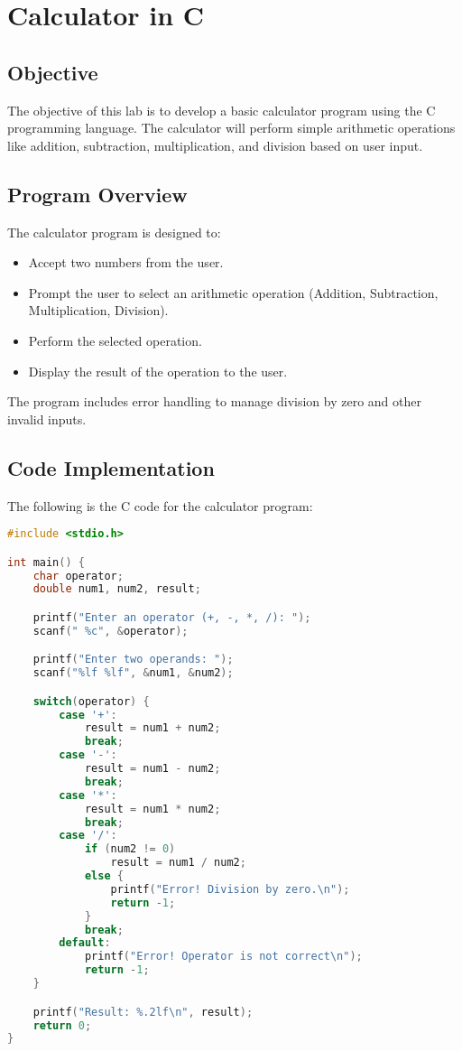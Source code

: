 
\section{Calculator in C }

\subsection{Objective}
The objective of this lab is to develop a basic calculator program using the C programming language. The calculator will perform simple arithmetic operations like addition, subtraction, multiplication, and division based on user input.

\subsection{Program Overview}
The calculator program is designed to:
\begin{itemize}
    \item Accept two numbers from the user.
    \item Prompt the user to select an arithmetic operation (Addition, Subtraction, Multiplication, Division).
    \item Perform the selected operation.
    \item Display the result of the operation to the user.
\end{itemize}
The program includes error handling to manage division by zero and other invalid inputs.

\subsection{Code Implementation}
The following is the C code for the calculator program:

\begin{lstlisting}[language=C, caption={Calculator Program in C}, label={lst:calculator}]
#include <stdio.h>

int main() {
    char operator;
    double num1, num2, result;

    printf("Enter an operator (+, -, *, /): ");
    scanf(" %c", &operator);

    printf("Enter two operands: ");
    scanf("%lf %lf", &num1, &num2);

    switch(operator) {
        case '+':
            result = num1 + num2;
            break;
        case '-':
            result = num1 - num2;
            break;
        case '*':
            result = num1 * num2;
            break;
        case '/':
            if (num2 != 0)
                result = num1 / num2;
            else {
                printf("Error! Division by zero.\n");
                return -1;
            }
            break;
        default:
            printf("Error! Operator is not correct\n");
            return -1;
    }

    printf("Result: %.2lf\n", result);
    return 0;
}
\end{lstlisting}

